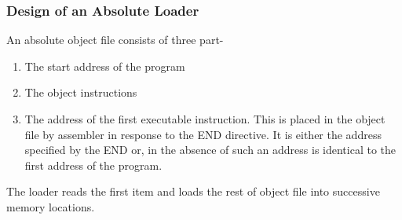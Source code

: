 \documentclass[12pt]{article}
\begin{document}
\subsubsection{Design of an Absolute Loader}

An absolute object file consists of three part-
\begin{enumerate}
\item The start address of the program
\item The object instructions
\item The address of the first executable instruction. This is placed in the
object file by assembler in response to the END directive. It is either the
address specified by the END or, in the absence of such an address is
identical to the first address of the program.
\end{enumerate}
The loader reads the first item and loads the rest of object file into
successive memory locations.






\end{document}
